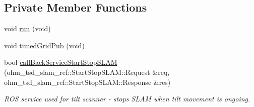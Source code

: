 \subsection*{Private Member Functions}
\begin{DoxyCompactItemize}
\item 
void \hyperlink{classohm__tsd__slam__ref_1_1SlamNode_aac99efb88f38b6df5923f6a410f000a4}{run} (void)
\item 
void \hyperlink{classohm__tsd__slam__ref_1_1SlamNode_a21616e87819cf356088b8a2c9697451d}{timed\-Grid\-Pub} (void)
\item 
bool \hyperlink{classohm__tsd__slam__ref_1_1SlamNode_a5b4ee64a1d3b1ead996762adfc95ad94}{call\-Back\-Service\-Start\-Stop\-S\-L\-A\-M} (ohm\-\_\-tsd\-\_\-slam\-\_\-ref\-::\-Start\-Stop\-S\-L\-A\-M\-::\-Request \&req, ohm\-\_\-tsd\-\_\-slam\-\_\-ref\-::\-Start\-Stop\-S\-L\-A\-M\-::\-Response \&res)
\begin{DoxyCompactList}\small\item\em R\-O\-S service used for tilt scanner -\/ stops S\-L\-A\-M when tilt movement is ongoing. \end{DoxyCompactList}\end{DoxyCompactItemize}
